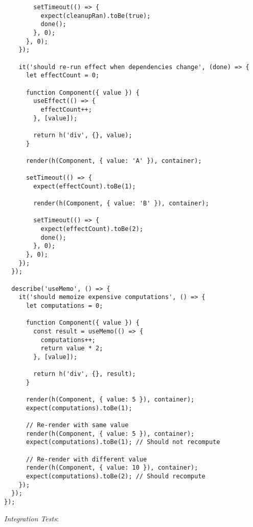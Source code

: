 \documentclass[11pt]{article}
\begin{document}
\begin{verbatim}
        setTimeout(() => {
          expect(cleanupRan).toBe(true);
          done();
        }, 0);
      }, 0);
    });
    
    it('should re-run effect when dependencies change', (done) => {
      let effectCount = 0;
      
      function Component({ value }) {
        useEffect(() => {
          effectCount++;
        }, [value]);
        
        return h('div', {}, value);
      }
      
      render(h(Component, { value: 'A' }), container);
      
      setTimeout(() => {
        expect(effectCount).toBe(1);
        
        render(h(Component, { value: 'B' }), container);
        
        setTimeout(() => {
          expect(effectCount).toBe(2);
          done();
        }, 0);
      }, 0);
    });
  });
  
  describe('useMemo', () => {
    it('should memoize expensive computations', () => {
      let computations = 0;
      
      function Component({ value }) {
        const result = useMemo(() => {
          computations++;
          return value * 2;
        }, [value]);
        
        return h('div', {}, result);
      }
      
      render(h(Component, { value: 5 }), container);
      expect(computations).toBe(1);
      
      // Re-render with same value
      render(h(Component, { value: 5 }), container);
      expect(computations).toBe(1); // Should not recompute
      
      // Re-render with different value
      render(h(Component, { value: 10 }), container);
      expect(computations).toBe(2); // Should recompute
    });
  });
});
\end{verbatim}

\emph{Integration Tests}:
\end{document}
